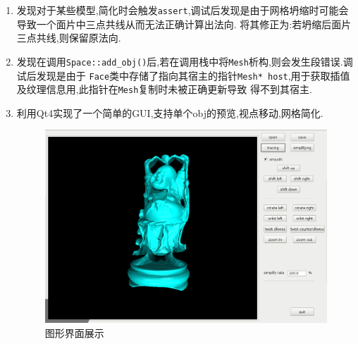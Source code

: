 \begin{enumerate}
\begin{figure}[H]
    \end{figure}

  \item 发现对于某些模型,简化时会触发\verb|assert|,调试后发现是由于网格坍缩时可能会导致一个面片中三点共线从而无法正确计算出法向.
    将其修正为:若坍缩后面片三点共线,则保留原法向.

  \item 发现在调用\verb|Space::add_obj()|后,若在调用栈中将\verb|Mesh|析构,则会发生段错误.调试后发现是由于
    \verb|Face|类中存储了指向其宿主的指针\verb|Mesh* host|,用于获取插值及纹理信息用,此指针在\verb|Mesh|复制时未被正确更新导致
    得不到其宿主.


  \item 利用Qt4实现了一个简单的GUI,支持单个obj的预览,视点移动,网格简化.

    \begin{figure}[H]
      \centering
      \includegraphics[scale=0.4]{img/gui.png}
      \caption{图形界面展示\label{fig:gui}}
    \end{figure}


\end{enumerate}
